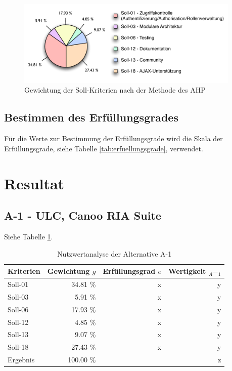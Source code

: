   \begin{figure}[ht]
    \begin{center}
      \includegraphics[width=0.95\textwidth]{./image/gewichtungSollKriterien.pdf}
      \caption{Gewichtung der Soll-Kriterien nach der Methode des AHP}
      \label{img:gewichtungSollKriterien}
    \end{center}
  \end{figure}
  
  \subsection{Bestimmen des Erfüllungsgrades}
  
  Für die Werte zur Bestimmung der Erfüllungsgrade wird die Skala der
  Erfüllungsgrade, siehe Tabelle \ref{tab:erfuellungsgrade}, verwendet.
  
  \section{Resultat}
  
  \subsection{A-1 - ULC, Canoo RIA Suite}
  
  Siehe Tabelle \ref{tab:nwaA1}.
  
  \begin{table}[ht]
    \sffamily 
    \begin{center}
      \begin{tabular}{l|rrr}
        \toprule
        Kriterien & Gewichtung \(g\) & Erfüllungsgrad \(e\) & Wertigkeit
        \(_A-_1\) \\
        \midrule
        Soll-01   & 34.81 \% & x & y \\
        Soll-03   &  5.91 \% & x & y \\
        Soll-06   & 17.93 \% & x & y \\
        Soll-12   &  4.85 \% & x & y \\
        Soll-13   &  9.07 \% & x & y \\
        Soll-18   & 27.43 \% & x & y \\
        \midrule
        \midrule
        Ergebnis  & 100.00 \% &   & z \\
        \bottomrule
      \end{tabular}
      \caption{Nutzwertanalyse der Alternative A-1}
      \label{tab:nwaA1}
    \end{center}
  \end{table}
  
